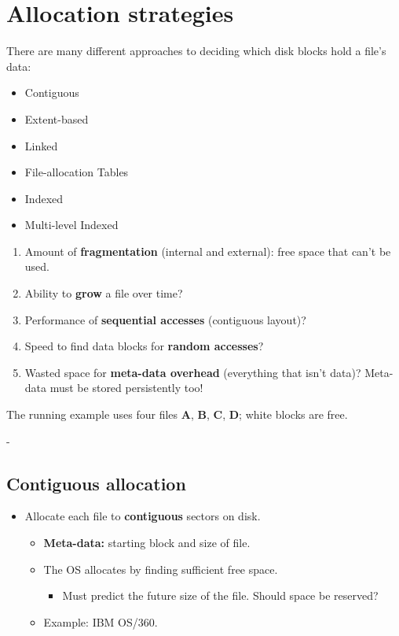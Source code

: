 \documentclass[11pt,a4paper]{article}
\makeatletter
\newcommand{\keepspace}[1]{\par\penalty-100\begingroup
  \setlength{\dimen@}{#1}\dimen@ii\pagegoal\advance\dimen@ii-\pagetotal
  \ifdim\dimen@>\dimen@ii\ifdim\dimen@ii>\z@\vfil\fi\break\fi\endgroup}
\makeatother
\begin{document}
\section{Allocation strategies}\label{sec:alloc}

There are many different approaches to deciding which disk blocks hold a
file's data:
\begin{itemize}
  \item Contiguous
  \item Extent-based
  \item Linked
  \item File-allocation Tables
  \item Indexed
  \item Multi-level Indexed
\end{itemize}

\begin{keybox}
\begin{enumerate}
  \item Amount of \textbf{fragmentation} (internal and external): free space
        that can't be used.
  \item Ability to \textbf{grow} a file over time?
  \item Performance of \textbf{sequential accesses} (contiguous layout)?
  \item Speed to find data blocks for \textbf{random accesses}?
  \item Wasted space for \textbf{meta-data overhead} (everything that isn't
        data)? Meta-data must be stored persistently too!
\end{enumerate}
\end{keybox}


The running example uses four files \textbf{A}, \textbf{B}, \textbf{C},
\textbf{D}; white blocks are free.

\keepspace{8\baselineskip}
\subsection{Contiguous allocation}

\begin{itemize}
  \item Allocate each file to \textbf{contiguous} sectors on disk.
  \begin{itemize}
    \item \textbf{Meta-data:} starting block and size of file.
    \item The OS allocates by finding sufficient free space.
    \begin{itemize}
      \item Must predict the future size of the file. Should space be
            reserved?
    \end{itemize}
    \item Example: IBM OS/360.
  \end{itemize}
\end{itemize}
\end{document}
